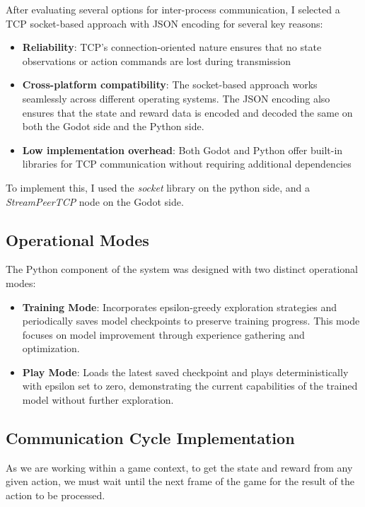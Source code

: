 After evaluating several options for inter-process communication, I selected a TCP socket-based approach with JSON encoding for several key reasons:

\begin{itemize}
    \item \textbf{Reliability}: TCP's connection-oriented nature ensures that no state observations or action commands are lost during transmission
    \item \textbf{Cross-platform compatibility}: The socket-based approach works seamlessly across different operating systems. The JSON encoding also ensures that the state and reward data is encoded and decoded the same on both the Godot side and the Python side.
    \item \textbf{Low implementation overhead}: Both Godot and Python offer built-in libraries for TCP communication without requiring additional dependencies
\end{itemize}

To implement this, I used the \textit{socket} library on the python side, and a \textit{StreamPeerTCP} node on the Godot side.

\subsection{Operational Modes}

The Python component of the system was designed with two distinct operational modes:

\begin{itemize}
    \item \textbf{Training Mode}: Incorporates epsilon-greedy exploration strategies and periodically saves model checkpoints to preserve training progress. This mode focuses on model improvement through experience gathering and optimization.
    \item \textbf{Play Mode}: Loads the latest saved checkpoint and plays deterministically with epsilon set to zero, demonstrating the current capabilities of the trained model without further exploration.
\end{itemize}

\subsection{Communication Cycle Implementation}

As we are working within a game context, to get the state and reward from any given action, we must wait until the next frame of the game for the result of the action to be processed. 


